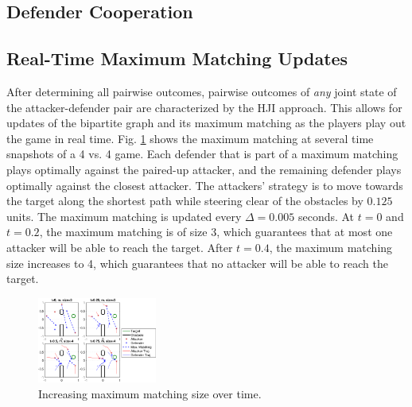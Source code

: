 \subsection{Defender Cooperation}

\subsection{Real-Time Maximum Matching Updates}
After determining all pairwise outcomes, pairwise outcomes of \textit{any} joint state of the attacker-defender pair are characterized by the HJI approach. This allows for updates of the bipartite graph and its maximum matching as the players play out the game in real time. Fig. \ref{fig:real_time_update} shows the maximum matching at several time snapshots of a 4 vs. 4 game. Each defender that is part of a maximum matching plays optimally against the paired-up attacker, and the remaining defender plays optimally against the closest attacker. The attackers' strategy is to move towards the target along the shortest path while steering clear of the obstacles by $0.125$ units. The maximum matching is updated every $\Delta=0.005$ seconds. At $t=0$ and $t=0.2$, the maximum matching is of size 3, which guarantees that at most one attacker will be able to reach the target. After $t=0.4$, the maximum matching size increases to 4, which guarantees that no attacker will be able to reach the target.

\begin{figure}
	\centering
	\includegraphics[width=0.35\textwidth]{"fig/time varying graph"}
	\caption{Increasing maximum matching size over time.}
	\label{fig:real_time_update}
\end{figure}
